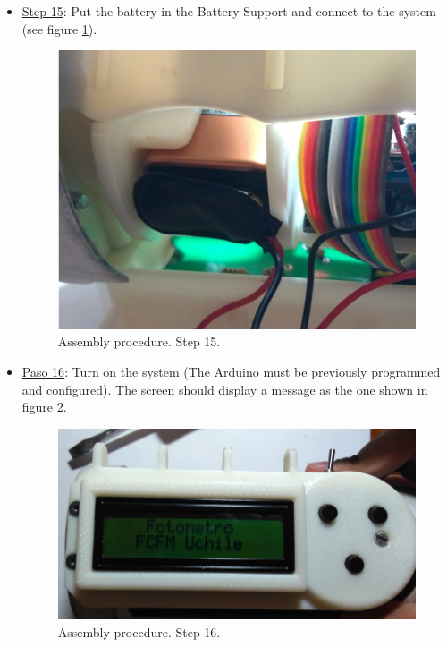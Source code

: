 \documentclass[12pt,letterpaper]{article}
\numberwithin{figure}{section}
\numberwithin{equation}{section}
\numberwithin{table}{section}
\begin{document}
\begin{itemize}
    \item \underline{Step 15}: Put the battery in the Battery Support and connect to the system (see figure \ref{fig:55}).
    
    \begin{figure}[H]
        \centering
        \includegraphics[scale=0.5]{Figuras/figure_55.jpg}
        \caption{Assembly procedure. Step 15.}
        \label{fig:55}    
    \end{figure}
    
    \item \underline{Paso 16}: Turn on the system (The Arduino must be previously programmed and configured). The screen should display a message as the one shown in figure \ref{fig:56}.
    
    \begin{figure}[H]
        \centering
        \includegraphics[scale=0.5]{Figuras/figure_56.jpg}
        \caption{Assembly procedure. Step 16.}
        \label{fig:56}    
    \end{figure}
    
\end{itemize}
\end{document}

